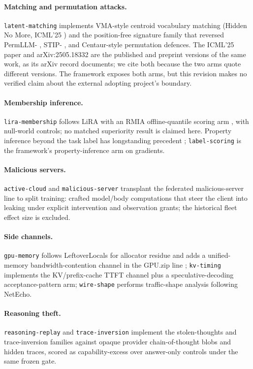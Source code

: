 \documentclass[11pt]{article}
\newcommand{\attack}[1]{\nolinkurl{#1}}
\begin{document}
\paragraph{Matching and permutation attacks.}
\attack{latent-matching} implements VMA-style centroid vocabulary matching
(Hidden No More, ICML'25 \cite{hiddennomore}) and the position-free
signature family \cite{sigmatch} that reversed PermLLM- \cite{permllm_zhang},
STIP- \cite{permlmm}, and Centaur-style
permutation defences. The ICML'25 paper and arXiv:2505.18332 are the
published and preprint versions of the same work, as its arXiv record
documents; we cite both because the two arms quote different versions.
The framework exposes both arms, but this revision makes no verified claim about the external adopting project's boundary.

\paragraph{Membership inference.}
\attack{lira-membership} follows LiRA \cite{lira} with an RMIA
offline-quantile scoring arm \cite{rmia}, with null-world controls; no matched superiority result is claimed here. Property inference beyond the task label has longstanding
precedent \cite{melis2019}; \attack{label-scoring} is the framework's
property-inference arm on gradients.

\paragraph{Malicious servers.}
\attack{active-cloud} and \attack{malicious-server} transplant the
federated malicious-server line \cite{boenisch,fowl} to split
training: crafted model/body computations that steer the client into
leaking under explicit intervention and observation grants; the historical fleet effect size is excluded.

\paragraph{Side channels.}
\attack{gpu-memory} follows LeftoverLocals \cite{leftoverlocals} for allocator
residue and adds a unified-memory bandwidth-contention channel in the
GPU.zip line \cite{gpuzip};
\attack{kv-timing} implements the KV/prefix-cache TTFT channel
\cite{kvleak} plus a speculative-decoding acceptance-pattern
arm; \attack{wire-shape} performs traffic-shape analysis following NetEcho.

\paragraph{Reasoning theft.}
\attack{reasoning-replay} and \attack{trace-inversion} implement the
stolen-thoughts and trace-inversion \cite{traceinv} families against
opaque provider chain-of-thought blobs and hidden traces, scored as
capability-excess over answer-only controls under the same frozen gate.
\end{document}
